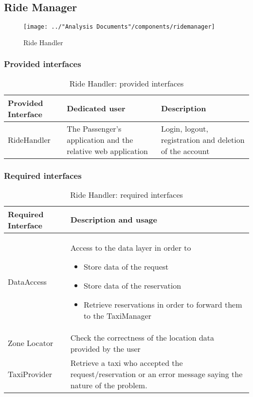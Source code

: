 \subsection{Ride Manager}
\begin{figure}[H]
	\centering
	\texttt{[image: ../"Analysis Documents"/components/ridemanager]}
	\label{fig:rideHandler}
	\caption{Ride Handler}
\end{figure}
\subsubsection{Provided interfaces}
\begin{table}[H]
\begin{longtable}{| p{} | p{} | p{} |}
\hline
 \textbf{Provided Interface} & \textbf{Dedicated user} & \textbf{Description} \\ \hline
RideHandler & The Passenger's application and the relative web application & Login, logout, registration and deletion of the account \\ \hline
\end{longtable}
\caption{Ride Handler: provided interfaces}
\label{tab:rideHandler:providedInterfaces}
\end{table}
\subsubsection{Required interfaces}
\begin{table}[H]
\begin{longtable}{| l | p{} |}
\hline
 \textbf{Required Interface} & \textbf{Description and usage} \\ \hline
DataAccess & Access to the data layer in order to 
			\begin{itemize}
				\item Store data of the request
				\item Store data of the reservation
				\item Retrieve reservations in order to forward them to the TaxiManager
			\end{itemize} \\ \hline
Zone Locator & Check the correctness of the location data provided by the user \\ \hline
TaxiProvider & Retrieve a taxi who accepted the request/reservation or an error message saying the nature of the problem. \\ \hline
\end{longtable}
\caption{Ride Handler: required interfaces}
\label{tab:rideHandler:requiredInterfaces}
\end{table}
